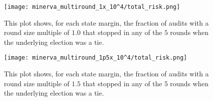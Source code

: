 \begin{figure}
\begin{centering}
\texttt{[image: minerva\_multiround\_1x\_10^4/total\_risk.png]}
\caption{This plot shows, for each state margin,
the fraction of \Minerva audits with a round size multiple of $1.0$ that stopped in any of the $5$ rounds when the underlying election was a tie.}
\label{fig:minerva1_risk}
\end{centering}
\end{figure}




\begin{figure}
\begin{centering}
\texttt{[image: minerva\_multiround\_1p5x\_10^4/total\_risk.png]}
\caption{This plot shows, for each state margin,
the fraction of \Minerva audits with a round size multiple of $1.5$ that stopped in any of the $5$ rounds when the underlying election was a tie.}
\label{fig:minerva1p5_risk}
\end{centering}
\end{figure}




